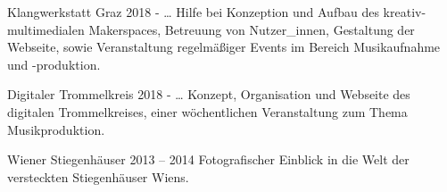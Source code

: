 \begin{projects}
	\project
	{Klangwerkstatt Graz}
	{2018 - …}
	{}
	{
		Hilfe bei Konzeption und Aufbau des kreativ-multimedialen Makerspaces,
		Betreuung von Nutzer\_innen, Gestaltung der Webseite, sowie
		Veranstaltung regelmäßiger Events im Bereich Musikaufnahme und
		-produktion.
	}
	{}

	\project
	{Digitaler Trommelkreis}
	{2018 - …}
	{}
	{
		Konzept, Organisation und Webseite des digitalen Trommelkreises, einer
		wöchentlichen Veranstaltung zum Thema Musikproduktion.
	}
	{}

	\project
	{Wiener Stiegenhäuser}
	{2013 – 2014}
	{}
	{
		Fotografischer Einblick in die Welt der versteckten Stiegenhäuser Wiens.
	}
	{}
\end{projects}